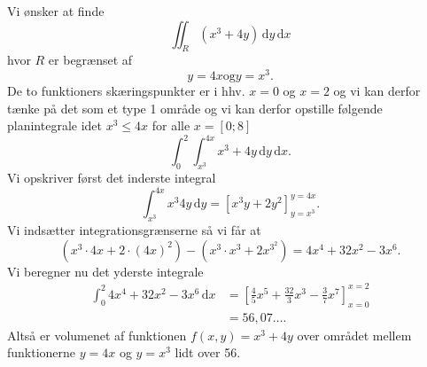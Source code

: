 \begin{eks}
  Vi ønsker at finde
  \[ 
  \iint_R \left( x^3 + 4y \right) \, \mathrm{d}y \, \mathrm{d}x 
  \]
  hvor $R$ er begrænset af
  \[ 
  y = 4x \text{og} y = x^3
  .\]
  De to funktioners skæringspunkter er i hhv. $x = 0$ og $x = 2$ og vi kan derfor tænke på det som et type 1 område og vi kan derfor opstille følgende planintegrale idet $x^3 \leq 4x$ for alle $x = [0;8]$
  \[ 
  \int_{0}^{2} \int_{x^3}^{4x} x^3 + 4y \, \mathrm{d}y \, \mathrm{d}x 
  .\]
  Vi opskriver først det inderste integral
  \[ 
    \int_{x^3}^{4x} x^3 4y \, \mathrm{d}y = [x^3y + 2y^2]_{y = x^3}^{y = 4x}
  .\]
  Vi indsætter integrationsgrænserne så vi får at
  \[
    \left( x^3 \cdot 4x + 2 \cdot (4x)^2 \right) - \left( x^3 \cdot x^3 + 2 x^{3^2} \right) = 4x^{4} + 32x^2 - 3x^{6}
  .\]
  Vi beregner nu det yderste integrale
  \begin{align*}
    \int_{0}^{2} 4x^{4} + 32x^2 - 3x^{6} \, \mathrm{d}x &= [\frac{4}{5} x^{5} + \frac{32}{3}x^3 - \frac{3}{7}x^{7}]_{x = 0}^{x = 2}  \\
    &=  56,07\ldots
  .\end{align*}
  Altså er volumenet af funktionen $f(x,y) = x^3 + 4y$ over området mellem funktionerne $y = 4x$ og $y = x^3$ lidt over 56.
\end{eks}


